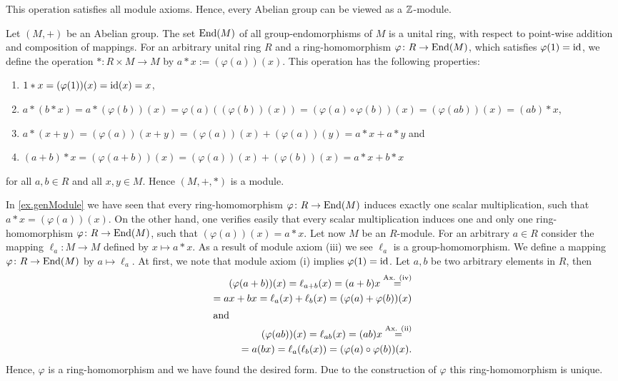 \begin{exam}
\begin{exlist}
\begin{equation*}
\end{equation*}
This operation satisfies all module axioms. Hence, every Abelian group can be viewed as a $\operatorname{\mathbb{Z}}$-module.
\item \label{ex.genModule} Let $(M,+)$ be an Abelian group. The set $\operatorname{\mathrm{End}}(M)$ of all group-endomorphisms of $M$ is a unital ring, with respect to point-wise addition and composition of mappings. For an arbitrary unital ring $R$ and a ring-homomorphism $\varphi\colon R\to\operatorname{\mathrm{End}}(M)$, which satisfies $\varphi(1)=\operatorname{id}$, we define the operation $\ast\colon R\times M\rightarrow M$ by $a\ast x:=(\varphi (a))(x)$. This operation has the following properties:
\begin{enumerate}
\item $1\ast x=(\varphi(1))(x)=\operatorname{id}(x)=x$,
\item $a\ast(b\ast x)=a\ast(\varphi(b))(x)=\varphi(a)((\varphi(b))(x))=(\varphi(a)\circ \varphi(b))(x)=(\varphi(ab))(x)=(ab)\ast x$,
\item $a\ast(x+y)=(\varphi(a))(x+y)=(\varphi(a))(x)+(\varphi(a))(y)=a\ast x+a\ast y$ and
\item $(a+b)\ast x= (\varphi(a+b))(x)=(\varphi(a))(x)+(\varphi(b))(x)=a\ast x+b\ast x$
\end{enumerate}
for all $a,b\in R$ and all $x,y\in M$. Hence $(M,+,\ast)$ is a module.
\end{exlist}
\end{exam}

In \cref{ex.genModule} we have seen that every ring-ho\-mo\-morph\-ism $\varphi\colon R\rightarrow\operatorname{\mathrm{End}}(M)$ induces exactly one scalar multiplication, such that $a\ast x=(\varphi(a))(x)$. On the other hand, one verifies easily that every scalar multiplication induces one and only one ring-ho\-mo\-morph\-ism $\varphi\colon R\rightarrow\operatorname{\mathrm{End}}(M)$, such that $(\varphi(a))(x)=a\ast x$. Let now $M$ be an $R$-module. For an arbitrary $a\in R$ consider the mapping $\ell_a\colon M\rightarrow M$ defined by $x\mapsto a\ast x$. As a result of module axiom (iii) we see $\ell_a$ is a group-homomorphism. We define a mapping $\varphi\colon R\rightarrow \operatorname{\mathrm{End}}(M)$ by $a \mapsto \ell_a$. At first, we note that module axiom (i) implies $\varphi(1)=\operatorname{id}$. Let $a,b$ be two arbitrary elements in $R$, then
\begin{align*}
(\varphi(a+b))(x)=\ell_{a+b}(x)=(a+b)x\overset{\text{Ax. (iv)}}{=}\\
=ax+bx=\ell_a(x)+\ell_b(x)=(\varphi(a)+\varphi(b))(x)\\
\intertext{and}
(\varphi(ab))(x)=\ell_{ab}(x)=(ab)x\overset{\text{Ax. (ii)}}{=}\\
=a(bx)=\ell_a(\ell_b(x))=(\varphi(a)\circ \varphi(b))(x).
\end{align*}
Hence, $\varphi$ is a ring-ho\-mo\-morph\-ism and we have found the desired form. Due to the construction of $\varphi$ this ring-homomorphism is  unique. 

